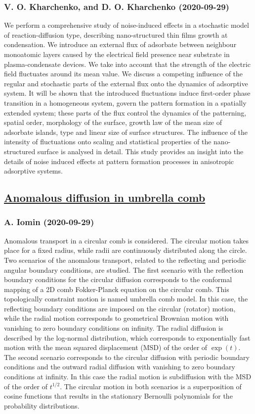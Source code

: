 \subsubsection*{V. O. Kharchenko, and D. O. Kharchenko (2020-09-29)}
We perform a comprehensive study of noise-induced effects in a stochastic
model of reaction-diffusion type, describing nano-structured thin films growth
at condensation. We introduce an external flux of adsorbate between neighbour
monoatomic layers caused by the electrical field presence near substrate in
plasma-condensate devices. We take into account that the strength of the
electric field fluctuates around its mean value. We discuss a competing
influence of the regular and stochastic parts of the external flux onto the
dynamics of adsorptive system. It will be shown that the introduced
fluctuations induce first-order phase transition in a homogeneous system,
govern the pattern formation in a spatially extended system; these parts of the
flux control the dynamics of the patterning, spatial order, morphology of the
surface, growth law of the mean size of adsorbate islands, type and linear size
of surface structures. The influence of the intensity of fluctuations onto
scaling and statistical properties of the nano-structured surface is analysed
in detail. This study provides an insight into the details of noise induced
effects at pattern formation processes in anisotropic adsorptive systems.

\subsection*{\href{http://arxiv.org/abs/2009.14067v1}{Anomalous diffusion in umbrella comb}}
\subsubsection*{A. Iomin (2020-09-29)}
Anomalous transport in a circular comb is considered. The circular motion
takes place for a fixed radius, while radii are continuously distributed along
the circle. Two scenarios of the anomalous transport, related to the reflecting
and periodic angular boundary conditions, are studied. The first scenario with
the reflection boundary conditions for the circular diffusion corresponds to
the conformal mapping of a 2D comb Fokker-Planck equation on the circular comb.
This topologically constraint motion is named umbrella comb model. In this
case, the reflecting boundary conditions are imposed on the circular (rotator)
motion, while the radial motion corresponds to geometrical Brownian motion with
vanishing to zero boundary conditions on infinity. The radial diffusion is
described by the log-normal distribution, which corresponds to exponentially
fast motion with the mean squared displacement (MSD) of the order of $\exp(t)$.
The second scenario corresponds to the circular diffusion with periodic
boundary conditions and the outward radial diffusion with vanishing to zero
boundary conditions at infinity. In this case the radial motion is subdiffusion
with the MSD of the order of $t^{1/2}$. The circular motion in both scenarios
is a superposition of cosine functions that results in the stationary Bernoulli
polynomials for the probability distributions.


